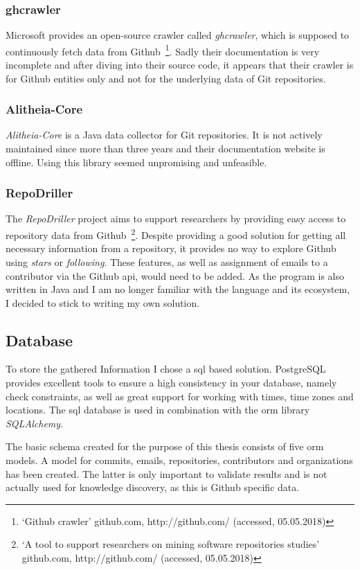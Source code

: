 \subsubsection{ghcrawler}
Microsoft provides an open-source crawler called \emph{ghcrawler}, which is supposed to continuously fetch data from Github~\footnote{`Github crawler' github.com, http://github.com/ (accessed, 05.05.2018)}.
Sadly their documentation is very incomplete and after diving into their source code, it appears that their crawler is for Github entities only and not for the underlying data of Git repositories.

\subsubsection{Alitheia-Core}
\emph{Alitheia-Core} is a Java data collector for Git repositories.
It is not actively maintained since more than three years and their documentation website is offline.
Using this library seemed unpromising and unfeasible.

\subsubsection{RepoDriller}
The \emph{RepoDriller} project aims to support researchers by providing easy access to repository data from Github~\footnote{`A tool to support researchers on mining software repositories studies' github.com, http://github.com/ (accessed, 05.05.2018)}.
Despite providing a good solution for getting all necessary information from a repository, it provides no way to explore Github using \emph{stars} or \emph{following}.
These features, as well as assignment of emails to a contributor via the Github \ac{api}, would need to be added.
As the program is also written in Java and I am no longer familiar with the language and its ecosystem, I decided to stick to writing my own solution.

\subsection{Database}\label{gitalizer-database}
To store the gathered Information I chose a \ac{sql} based solution.
PostgreSQL provides excellent tools to ensure a high consistency in your database, namely check constraints, as well as great support for working with times, time zones and locations.
The \ac{sql} database is used in combination with the \ac{orm} library \emph{SQLAlchemy}.

The basic schema created for the purpose of this thesis consists of five \ac{orm} models.
A model for commits, emails, repositories, contributors and organizations has been created.
The latter is only important to validate results and is not actually used for knowledge discovery, as this is Github specific data.

